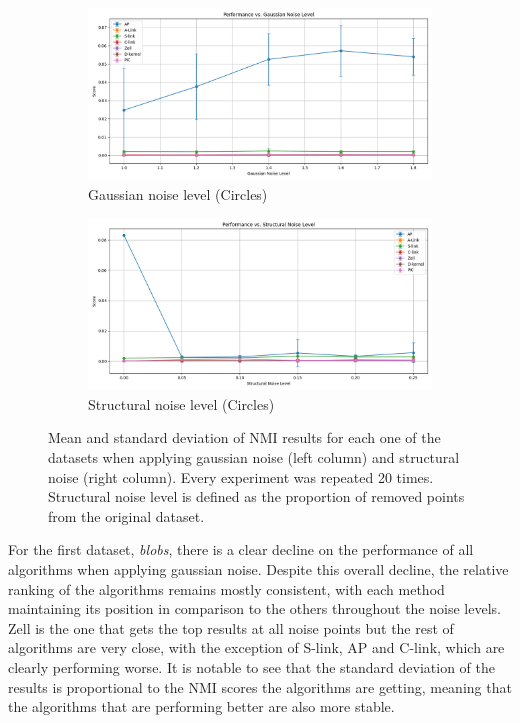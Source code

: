 \documentclass[
	10pt,
	parskip=half-,	
	paper=a4,
	english
	]{scrartcl}
\begin{document}
\begin{figure}[h!]
    \begin{subfigure}[b]{0.45\textwidth}
        \includegraphics[width=\textwidth]{../data/plots/results_gaussian_noise_circles.png}
        \caption{Gaussian noise level (Circles)}
    \end{subfigure}
    \begin{subfigure}[b]{0.45\textwidth}
        \includegraphics[width=\textwidth]{../data/plots/results_structural_noise_circles.png}
        \caption{Structural noise level (Circles)}
    \end{subfigure}

    \caption{Mean and standard deviation of NMI results for each one of the datasets when applying gaussian noise (left column) and structural noise (right column). Every experiment was repeated 20 times. Structural noise level is defined as the proportion of removed points from the original dataset.}
    \label{fig:noise_analysis}
\end{figure}

For the first dataset, \textit{blobs}, there is a clear decline on the performance of all algorithms when applying gaussian noise. Despite this overall decline, the relative ranking of the algorithms remains mostly consistent, with each method maintaining its position in comparison to the others throughout the noise levels. Zell is the one that gets the top results at all noise points but the rest of algorithms are very close, with the exception of S-link, AP and C-link, which are clearly performing worse. It is notable to see that the standard deviation of the results is proportional to the NMI scores the algorithms are getting, meaning that the algorithms that are performing better are also more stable.
\end{document}
